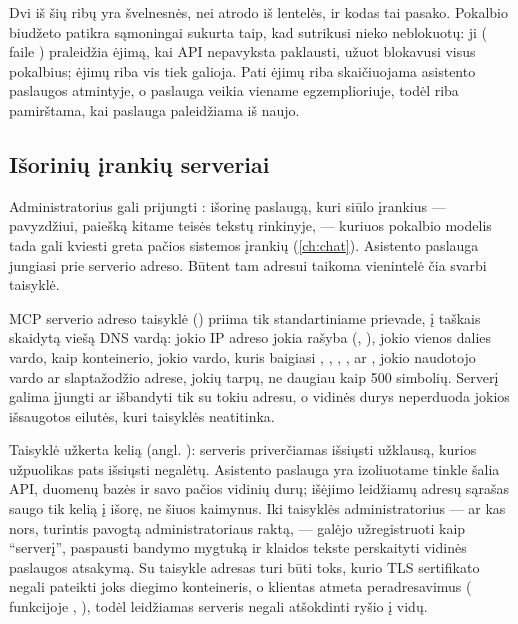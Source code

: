 Dvi iš šių ribų yra švelnesnės, nei atrodo iš lentelės, ir kodas tai pasako. Pokalbio biudžeto
patikra sąmoningai sukurta taip, kad sutrikusi nieko neblokuotų: ji ( faile
) praleidžia ėjimą, kai API nepavyksta paklausti, užuot blokavusi visus
pokalbius; ėjimų riba vis tiek galioja. Pati ėjimų riba skaičiuojama asistento paslaugos
atmintyje, o paslauga veikia viename egzemplioriuje, todėl riba pamirštama, kai paslauga
paleidžiama iš naujo.

\subsection{Išorinių įrankių serveriai}\label{sec:security:ai:mcp}

Administratorius gali prijungti : išorinę paslaugą, kuri siūlo įrankius ---
pavyzdžiui, paiešką kitame teisės tekstų rinkinyje, --- kuriuos pokalbio modelis tada gali
kviesti greta pačios sistemos įrankių (\cref{ch:chat}). Asistento paslauga jungiasi prie
serverio adreso. Būtent tam adresui taikoma vienintelė čia svarbi taisyklė.

\begin{codebox}{MCP serverio adreso taisyklė}
 () priima tik  standartiniame
prievade, į taškais skaidytą viešą DNS vardą: jokio IP adreso jokia rašyba (,
), jokio vienos dalies vardo, kaip konteinerio, jokio vardo, kuris baigiasi
, , , ,  ar
, jokio naudotojo vardo ar slaptažodžio adrese, jokių tarpų, ne daugiau kaip
500 simbolių. Serverį galima įjungti ar išbandyti tik su tokiu adresu, o vidinės durys neperduoda
jokios išsaugotos eilutės, kuri taisyklės neatitinka.
\end{codebox}

Taisyklė užkerta kelią  (angl. ): serveris priverčiamas išsiųsti užklausą, kurios užpuolikas pats išsiųsti
negalėtų. Asistento paslauga yra izoliuotame tinkle šalia API, duomenų bazės ir savo pačios
vidinių durų; išėjimo leidžiamų adresų sąrašas saugo tik kelią į išorę, ne šiuos kaimynus. Iki
taisyklės administratorius --- ar kas nors, turintis pavogtą administratoriaus raktą, ---
galėjo užregistruoti  kaip \enquote{serverį}, paspausti
bandymo mygtuką ir klaidos tekste perskaityti vidinės paslaugos atsakymą. Su taisykle adresas
turi būti toks, kurio TLS sertifikato negali pateikti joks diegimo konteineris, o klientas
atmeta peradresavimus (  funkcijoje ,
), todėl leidžiamas serveris negali atšokdinti ryšio į vidų.

